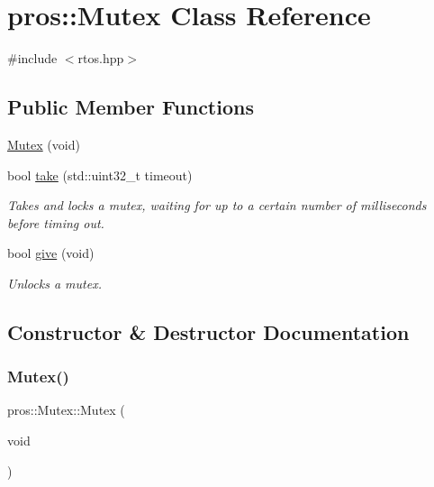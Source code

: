 \hypertarget{classpros_1_1Mutex}{}\section{pros\+::Mutex Class Reference}
\label{classpros_1_1Mutex}


{\ttfamily \#include $<$rtos.\+hpp$>$}

\subsection*{Public Member Functions}
\begin{DoxyCompactItemize}
\item 
\mbox{\hyperlink{classpros_1_1Mutex_a96d568fada90acb8b79d82a3687f8f18}{Mutex}} (void)
\item 
bool \mbox{\hyperlink{classpros_1_1Mutex_a70da733375f7b4b68475881578c78516}{take}} (std\+::uint32\+\_\+t timeout)
\begin{DoxyCompactList}\small\item\em Takes and locks a mutex, waiting for up to a certain number of milliseconds before timing out. \end{DoxyCompactList}\item 
bool \mbox{\hyperlink{classpros_1_1Mutex_a1c3e7ee193608a27a5a509ee7930363b}{give}} (void)
\begin{DoxyCompactList}\small\item\em Unlocks a mutex. \end{DoxyCompactList}\end{DoxyCompactItemize}


\subsection{Constructor \& Destructor Documentation}
\mbox{\label{classpros_1_1Mutex_a96d568fada90acb8b79d82a3687f8f18}} 
\subsubsection{\texorpdfstring{Mutex()}{Mutex()}}
{\footnotesize\ttfamily pros\+::\+Mutex\+::\+Mutex (\begin{DoxyParamCaption}\item[{void}]{ }\end{DoxyParamCaption})}



